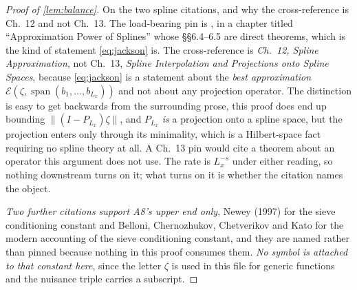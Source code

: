 \begin{proof}[Proof of \cref{lem:balance}]
On the two spline citations, and why the cross-reference is \textup{Ch.~12} and not
\textup{Ch.~13}. The load-bearing pin is \citet[Thm.~6.27]{schumaker2007}, in a chapter titled
``Approximation Power of Splines'' whose §§6.4--6.5 are direct theorems, which is the kind of
statement \eqref{eq:jackson} is. The \citet{devorelorentz1993} cross-reference is \emph{Ch.~12, Spline
Approximation}, not Ch.~13, \emph{Spline Interpolation and Projections onto Spline Spaces}, because
\eqref{eq:jackson} is a statement about the \emph{best approximation}
$\mathcal E(\zeta,\operatorname{span}(b_1,\dots,b_{L_x}))$ and not
about any projection operator. The distinction is easy to get backwards from the surrounding prose, 
this proof does end up bounding $\|(I-P_{L_x})\zeta\|$, and $P_{L_x}$ \emph{is} a projection onto a
spline space, but the projection enters only through its minimality, which is a Hilbert-space fact
requiring no spline theory at all. A Ch.~13 pin would cite a theorem about an operator this
argument does not use. The rate is $L_x^{-s}$ under either reading, so nothing downstream turns on it;
what turns on it is whether the citation names the object.

\emph{Two further citations support A8's \textup{upper} end only}, Newey (1997) for the sieve
conditioning constant and Belloni, Chernozhukov, Chetverikov and Kato for the modern accounting of the
sieve conditioning constant, and they are named rather than pinned because nothing in this proof
consumes them. \emph{No symbol is attached to that constant here}, since the letter $\zeta$ is used in
this file for generic functions and the nuisance triple carries a subscript.
\end{proof}

